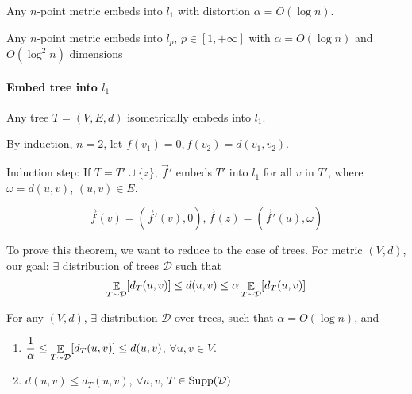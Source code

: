 \begin{theorem}[Bourgain' 1985]
    Any  $ n $-point metric embeds into  $ l_1 $ with distortion  $ \alpha=O(\log n) $.   
\end{theorem}
\begin{theorem}[LLR 1995]
    Any  $ n $-point metric embeds into  $ l_p $,  $ p\in [1,+\infty] $ with  $ \alpha=O(\log n) $ and  $ O(\log ^2 n) $ dimensions     
\end{theorem}
\paragraph{Embed tree into  $ l_1 $} Any tree  $ T=(V,E,d) $ isometrically embeds into  $ l_1 $.

By induction,  $ n=2 $, let  $ f(v_1)=0,f(v_2)=d(v_1,v_2) $.

Induction step: If  $ T=T'\cup\{z\} $,  $ \vec{f}' $ embeds  $ T' $  into  $ l_1 $ for all  $ v $ in  $ T' $, where $ \omega=d(u,v) $,  $ (u,v)\in E $.  

\[\vec{f}(v)=(\vec{f}'(v),0),\vec{f}(z)=(\vec{f}'(u),\omega)\] 

To prove this theorem, we want to reduce to the case of trees.
For metric  $ (V,d) $, our goal:  $ \exists $  distribution of trees  $ \mathcal{D} $  such that 
\[\mathop\mathbb E_{T\sim \mathcal{D}}[d_T(u,v)] \leq d(u,v) \leq \alpha\mathop\mathbb E_{T\sim \mathcal{D}}[d_T(u,v)]\]

\begin{theorem}
    For any  $ (V,d) $,  $ \exists  $ distribution  $ \mathcal{D} $ over trees, such that  $ \alpha=O(\log n) $, and 
    \begin{enumerate}[label=\arabic*)]
        \item  $ \displaystyle\frac{1}{\alpha} \leq \mathop\mathbb E_{T\sim \mathcal{D}}[d_T(u,v)] \leq d(u,v) $,  $ \forall u,v\in V $.
        \item  $ d(u,v) \leq d_T(u,v) $,  $ \forall u,v $,  $ T\in \mathrm{Supp}(\mathcal D) $     
    \end{enumerate}   
\end{theorem}

